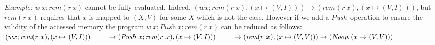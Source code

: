 \documentclass[preprint,12pt]{elsarticle}
\newcommand{\symb}[1]{\textit{#1}}
\newcommand{\noop}{\symb{Noop}}
\newcommand{\Push}{\symb{Push}}
\newcommand{\Pull}{\symb{Pull}}
\newcommand{\isvalid}{\symb{isValid}}
\newcommand{\isremvalid}{\symb{remIsValid}}
\newcommand{\rem}[1]{\symb{rem}(#1)}
\newcommand{\IF}[3]{\symb{if}\,(#1)~#2~\symb{else}~#3 }
\newcommand{\transl}[1]{\llbracket#1\rrbracket}
\begin{document}
\noindent
   \emph{Example:} 
    $w~ x;\rem{r~x}$ cannot be fully evaluated. Indeed, $(w x;\rem{r~x},(x\mapsto 
    (V,I)))\to (\rem{r~x},(x\mapsto (V,I)))$, but  $\rem{r~x}$ requires that $x$ is 
    mapped to $(X,V)$ for some $X$ which is not the case.
However if we add a \Push\ operation to ensure the validity of the accessed memory the 
program $w~x;\Push~x;\rem{r~x}$ can be reduced as follows:\\
$(w x;\rem{r~x},(x\mapsto (V,I)))\\~\qquad\to (\Push~x;\rem{r~x},(x\mapsto 
(V,I)))\\~\qquad\to 
(\rem{r~x},(x\mapsto (V,V)))\to (\noop,(x\mapsto (V,V)))$

%
%
%
%
%
\end{document}
